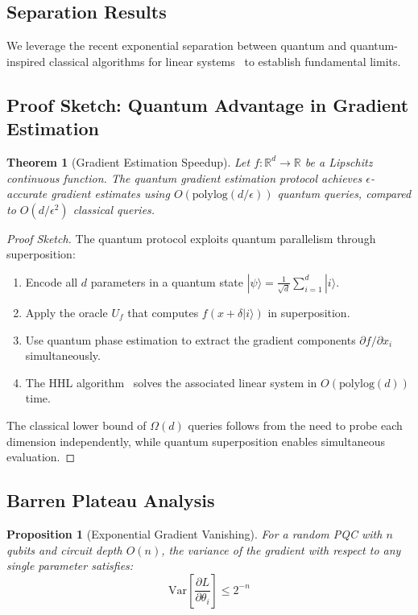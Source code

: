 \documentclass[11pt,a4paper]{article}
\newtheorem{theorem}{Theorem}
\newtheorem{proposition}{Proposition}
\begin{document}
\subsection{Separation Results}
We leverage the recent exponential separation between quantum and quantum-inspired classical algorithms for linear systems~\cite{gronlund2025} to establish fundamental limits.

\subsection{Proof Sketch: Quantum Advantage in Gradient Estimation}

\begin{theorem}[Gradient Estimation Speedup]
Let $f: \mathbb{R}^d \to \mathbb{R}$ be a Lipschitz continuous function. The quantum gradient estimation protocol achieves $\epsilon$-accurate gradient estimates using $O(\text{polylog}(d/\epsilon))$ quantum queries, compared to $O(d/\epsilon^2)$ classical queries.
\end{theorem}

\begin{proof}[Proof Sketch]
The quantum protocol exploits quantum parallelism through superposition:
\begin{enumerate}
    \item Encode all $d$ parameters in a quantum state $|\psi\rangle = \frac{1}{\sqrt{d}} \sum_{i=1}^{d} |i\rangle$.
    \item Apply the oracle $U_f$ that computes $f(x + \delta|i\rangle)$ in superposition.
    \item Use quantum phase estimation to extract the gradient components $\partial f / \partial x_i$ simultaneously.
    \item The HHL algorithm~\cite{harrow2009} solves the associated linear system in $O(\text{polylog}(d))$ time.
\end{enumerate}
The classical lower bound of $\Omega(d)$ queries follows from the need to probe each dimension independently, while quantum superposition enables simultaneous evaluation.
\end{proof}

\subsection{Barren Plateau Analysis}

\begin{proposition}[Exponential Gradient Vanishing]
For a random PQC with $n$ qubits and circuit depth $O(n)$, the variance of the gradient with respect to any single parameter satisfies:
\begin{equation}
    \text{Var}\left[\frac{\partial L}{\partial \theta_i}\right] \leq 2^{-n}
\end{equation}
\end{proposition}
\end{document}
